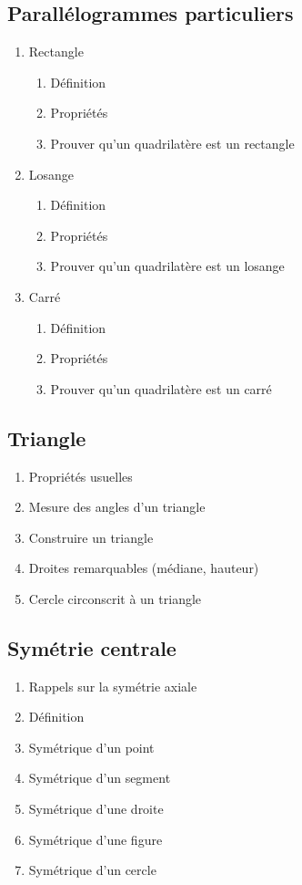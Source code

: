 \subsection{Parallélogrammes particuliers}\label{ch_5_para2}
\begin{enumerate}
	\item Rectangle
		\begin{enumerate}
			\item Définition
			\item Propriétés
			\item Prouver qu'un quadrilatère est un rectangle
		\end{enumerate}
	\item Losange
		\begin{enumerate}
			\item Définition
			\item Propriétés
			\item Prouver qu'un quadrilatère est un losange
		\end{enumerate}
	\item Carré
		\begin{enumerate}
			\item Définition
			\item Propriétés
			\item Prouver qu'un quadrilatère est un carré
		\end{enumerate}
\end{enumerate}

\subsection{Triangle}\label{ch_5_tri}
	\begin{enumerate}
		\item Propriétés usuelles
		\item Mesure des angles d'un triangle
		\item Construire un triangle
		\item Droites remarquables (médiane, hauteur)
		\item Cercle circonscrit à un triangle
	\end{enumerate}
	
\subsection{Symétrie centrale}\label{ch_5_sym}	
\begin{enumerate}
	\item Rappels sur la symétrie axiale
	\item Définition
	\item Symétrique d'un point
	\item Symétrique d'un segment
	\item Symétrique d'une droite
	\item Symétrique d'une figure
	\item Symétrique d'un cercle
\end{enumerate}


